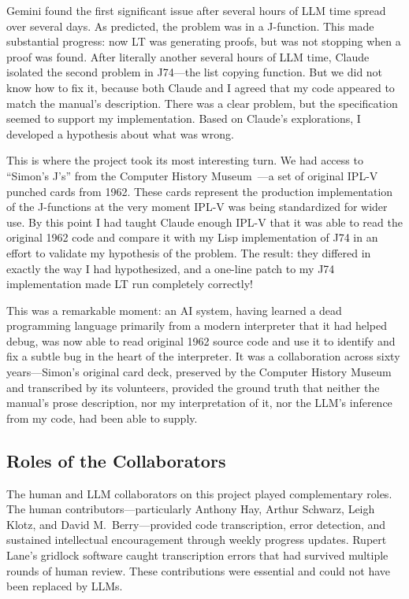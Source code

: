 \documentclass[journal]{IEEEtran}
\begin{document}
Gemini found the first significant issue after several hours of LLM
time spread over several days. As predicted, the problem was in a
J-function. This made substantial progress: now LT was generating
proofs, but was not stopping when a proof was found. After literally
another several hours of LLM time, Claude isolated the second problem
in J74---the list copying function. But we did not know how to fix it,
because both Claude and I agreed that my code appeared to match the
manual's description. There was a clear problem, but the specification
seemed to support my implementation. Based on Claude's explorations, I
developed a hypothesis about what was wrong.

This is where the project took its most interesting turn.  We had
access to ``Simon's J's'' from the Computer History
Museum~\cite{bochannek2012simonsjs}---a set of original IPL-V punched
cards from 1962.  These cards represent the production implementation
of the J-functions at the very moment IPL-V was being standardized for
wider use.  By this point I had taught Claude enough IPL-V that it was
able to read the original 1962 code and compare it with my Lisp
implementation of J74 in an effort to validate my hypothesis of the
problem. The result: they differed in exactly the way I had
hypothesized, and a one-line patch to my J74 implementation made LT
run completely correctly!

This was a remarkable moment: an AI system, having learned a dead
programming language primarily from a modern interpreter that it had
helped debug, was now able to read original 1962 source code and use
it to identify and fix a subtle bug in the heart of the
interpreter. It was a collaboration across sixty years---Simon's
original card deck, preserved by the Computer History Museum and
transcribed by its volunteers, provided the ground truth that neither
the manual's prose description, nor my interpretation of it, nor the
LLM's inference from my code, had been able to supply.

\subsection{Roles of the Collaborators}

The human and LLM collaborators on this project played complementary
roles. The human contributors---particularly Anthony Hay, Arthur
Schwarz, Leigh Klotz, and David M.\ Berry---provided code
transcription, error detection, and sustained intellectual
encouragement through weekly progress updates. Rupert Lane's gridlock
software caught transcription errors that had survived multiple rounds
of human review. These contributions were essential and could not have
been replaced by LLMs.
\end{document}
